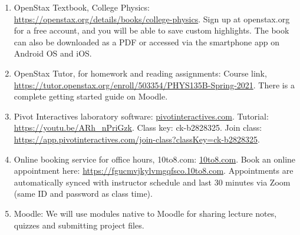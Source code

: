 \documentclass[10pt]{article}
\begin{document}
\begin{enumerate}
\item OpenStax Textbook, College Physics: \url{https://openstax.org/details/books/college-physics}.  Sign up at openstax.org for a free account, and you will be able to save custom highlights.  The book can also be downloaded as a PDF or accessed via the smartphone app on Android OS and iOS.
\item OpenStax Tutor, for homework and reading assignments: Course link, \url{https://tutor.openstax.org/enroll/503354/PHYS135B-Spring-2021}.  There is a complete getting started guide on Moodle.
\item Pivot Interactives laboratory software: \url{pivotinteractives.com}. Tutorial: \url{https://youtu.be/ARh_nPriGzk}.  Class key: ck-b2828325.  Join class: \url{https://app.pivotinteractives.com/join-class?classKey=ck-b2828325}.
\item Online booking service for office hours, 10to8.com: \url{10to8.com}.  Book an online appointment here: \url{https://fgucmvjkylvmgqfsco.10to8.com}.  Appointments are automatically synced with instructor schedule and last 30 minutes via Zoom (same ID and password as class time).
\item Moodle: We will use modules native to Moodle for sharing lecture notes, quizzes and submitting project files. 
\end{enumerate}
\end{document}

